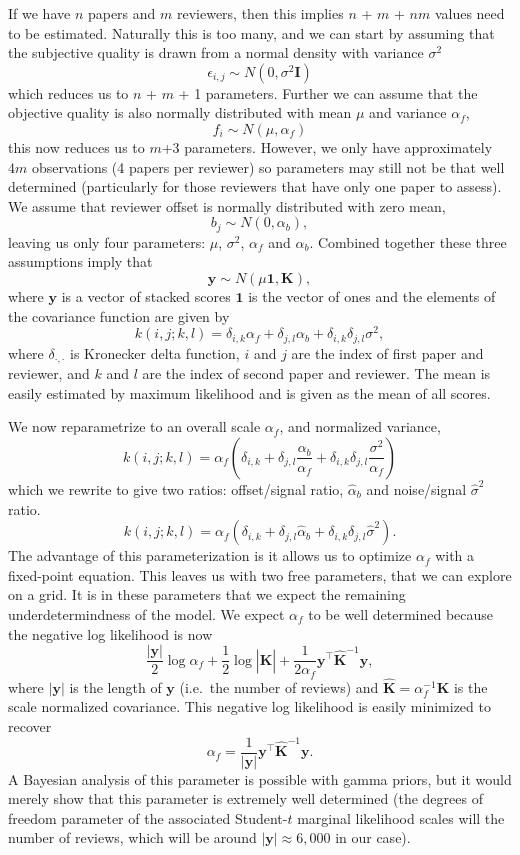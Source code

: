 If we have \(n\) papers and \(m\) reviewers, then this implies \(n\) +
\(m\) + \(nm\) values need to be estimated. Naturally this is too many,
and we can start by assuming that the subjective quality is drawn from a
normal density with variance \(\sigma^2\) \[
\epsilon_{i, j} \sim N(0, \sigma^2 \mathbf{I})
\] which reduces us to \(n\) + \(m\) + 1 parameters. Further we can
assume that the objective quality is also normally distributed with mean
\(\mu\) and variance \(\alpha_f\), 
\[
f_i \sim N(\mu, \alpha_f)
\]
this now reduces us to \(m\)+3 parameters. However, we only have
approximately \(4m\) observations (4 papers per reviewer) so parameters
may still not be that well determined (particularly for those reviewers
that have only one paper to assess). We assume that reviewer
offset is normally distributed with zero mean, 
\[
b_j \sim N(0, \alpha_b),
\] 
leaving us only four parameters: \(\mu\), \(\sigma^2\), \(\alpha_f\)
and \(\alpha_b\). Combined together these three assumptions imply that
\[
\mathbf{y} \sim N(\mu \mathbf{1}, \mathbf{K}),
\]
where \(\mathbf{y}\) is a vector of stacked scores \(\mathbf{1}\) is
the vector of ones and the elements of the covariance function are given
by 
\[
k(i,j; k,l) = \delta_{i,k} \alpha_f + \delta_{j,l} \alpha_b + \delta_{i, k}\delta_{j,l} \sigma^2,
\] 
where $\delta_{\cdot,\cdot}$ is Kronecker delta function, \(i\) and \(j\) are the index of first paper and reviewer, and
\(k\) and \(l\) are the index of second paper and reviewer. The mean is
easily estimated by maximum likelihood and is given as the mean of all
scores.

We now reparametrize  to an overall scale
\(\alpha_f\), and normalized variance, \[
k(i,j; k,l) = \alpha_f\left(\delta_{i,k}  + \delta_{j,l} \frac{\alpha_b}{\alpha_f} + \delta_{i, k}\delta_{j,l} \frac{\sigma^2}{\alpha_f}\right)
\]
which we rewrite to give two ratios: offset/signal ratio,
\(\hat{\alpha}_b\) and noise/signal \(\hat{\sigma}^2\) ratio. \[
k(i,j; k,l) = \alpha_f\left(\delta_{i,k}  + \delta_{j,l} \hat{\alpha}_b + \delta_{i, k}\delta_{j,l} \hat{\sigma}^2\right).
\] 
The advantage of this parameterization is it allows us to optimize
\(\alpha_f\) with a fixed-point equation. This leaves us with two free parameters, that we can
explore on a grid. It is in these parameters that we expect the
remaining underdetermindness of the model. We expect \(\alpha_f\) to be
well determined because the negative log likelihood is now 
\[
\frac{|\mathbf{y}|}{2}\log\alpha_f + \frac{1}{2}\log  \left|\hat{\mathbf{K}}\right| + \frac{1}{2\alpha_f}\mathbf{y}^\top \hat{\mathbf{K}}^{-1} \mathbf{y},
\]
where \(|\mathbf{y}|\) is the length of \(\mathbf{y}\) (i.e.~the
number of reviews) and \(\hat{\mathbf{K}}=\alpha_f^{-1}\mathbf{K}\) is
the scale normalized covariance. This negative log likelihood is easily
minimized to recover 
\[
\alpha_f = \frac{1}{|\mathbf{y}|} \mathbf{y}^\top \hat{\mathbf{K}}^{-1} \mathbf{y}.
\] 
A Bayesian analysis of this parameter is possible with gamma priors,
but it would merely show that this parameter is extremely well
determined (the degrees of freedom parameter of the associated
Student-\(t\) marginal likelihood scales will the number of reviews,
which will be around \(|\mathbf{y}| \approx 6,000\) in our case).

